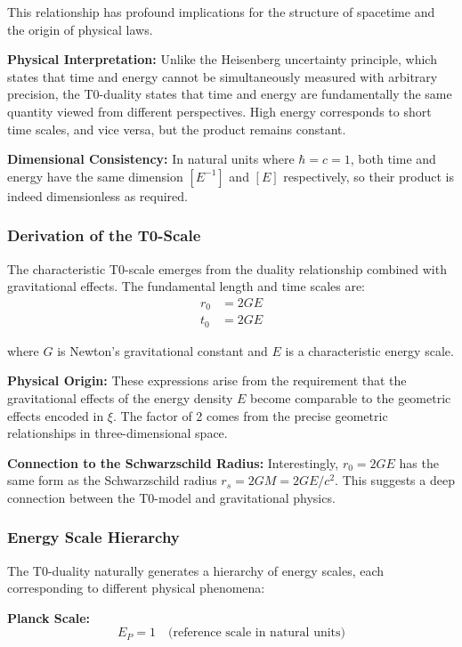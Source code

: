 \documentclass[12pt,a4paper]{article}
\begin{document}
	This relationship has profound implications for the structure of spacetime and the origin of physical laws.
	
	\textbf{Physical Interpretation:} Unlike the Heisenberg uncertainty principle, which states that time and energy cannot be simultaneously measured with arbitrary precision, the T0-duality states that time and energy are fundamentally the same quantity viewed from different perspectives. High energy corresponds to short time scales, and vice versa, but the product remains constant.
	
	\textbf{Dimensional Consistency:} In natural units where $\hbar = c = 1$, both time and energy have the same dimension $[E^{-1}]$ and $[E]$ respectively, so their product is indeed dimensionless as required.
	
	\subsubsection{Derivation of the T0-Scale}
	
	The characteristic T0-scale emerges from the duality relationship combined with gravitational effects. The fundamental length and time scales are:
	\begin{align}
		r_0 &= 2GE \\
		t_0 &= 2GE
	\end{align}
	
	where $G$ is Newton's gravitational constant and $E$ is a characteristic energy scale.
	
	\textbf{Physical Origin:} These expressions arise from the requirement that the gravitational effects of the energy density $E$ become comparable to the geometric effects encoded in $\xi$. The factor of 2 comes from the precise geometric relationships in three-dimensional space.
	
	\textbf{Connection to the Schwarzschild Radius:} Interestingly, $r_0 = 2GE$ has the same form as the Schwarzschild radius $r_s = 2GM = 2GE/c^2$. This suggests a deep connection between the T0-model and gravitational physics.
	
	\subsubsection{Energy Scale Hierarchy}
	
	The T0-duality naturally generates a hierarchy of energy scales, each corresponding to different physical phenomena:
	
	\textbf{Planck Scale:}
	\begin{equation}
		E_P = 1 \quad \text{(reference scale in natural units)}
	\end{equation}
	
\end{document}
